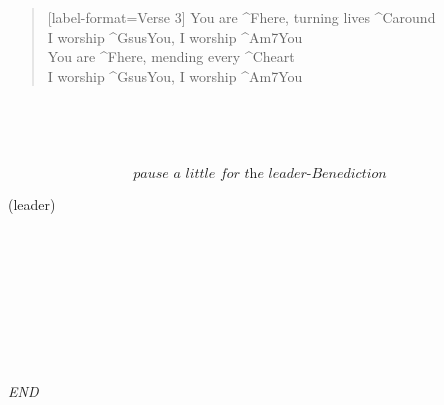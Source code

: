 \begin{verse}[label-format={Verse 3}]
  You are ^{F}here, turning lives ^{C}around \\ I worship ^{Gsus}You, I worship ^{Am7}You \\
  You are ^{F}here, mending every ^{C}heart  \\ I worship ^{Gsus}You, I worship ^{Am7}You
\end{verse}

\begin{chorus}
  \uqonid{} \\
  \uqonid{}
\end{chorus}

\begin{refrain}
  \ihmfyl{} \\
  \ihmfyl{}
\end{refrain}

\[\textit{pause a little for the leader-Benediction}\]

\begin{bridge}[format={\sffamily \itshape}]
  (leader) \\
  \ldfjft{} \\
  \ldfjft{}
\end{bridge}

\begin{together}
  \ldfjft{} \\
  \ldfjft{}
\end{together}

\begin{chorus}
  \uqonid{} \\
  \uqonid{}
\end{chorus}

\begin{outro}
  \ihmfyl{} \\
  \ihmfyl{}
\end{outro}

\begin{acappella}
  \ihmfyl{} \\
  \ihmfyl{}
\end{acappella}

\itshape END


